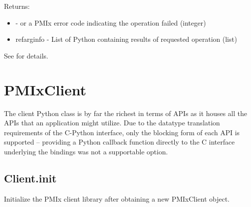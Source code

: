 \begin{arglist}
\end{arglist}

Returns:
\begin{itemize}
    \item {} -  or a \ac{PMIx} error code indicating the operation failed (integer)
    \item refarg{info} - List of Python  containing results of requested operation (list)
\end{itemize}

See  for details.


\section{PMIxClient}
\label{app:python:client}

The client Python class is by far the richest in terms of \acp{API} as it houses all the \acp{API} that an application might utilize. Due to the datatype translation requirements of the C-Python interface, only the blocking form of each \ac{API} is supported – providing a Python callback function directly to the C interface underlying the bindings was not a supportable option.


\subsection{Client.init}

\summary Initialize the \ac{PMIx} client library after obtaining a new PMIxClient object.

\format

